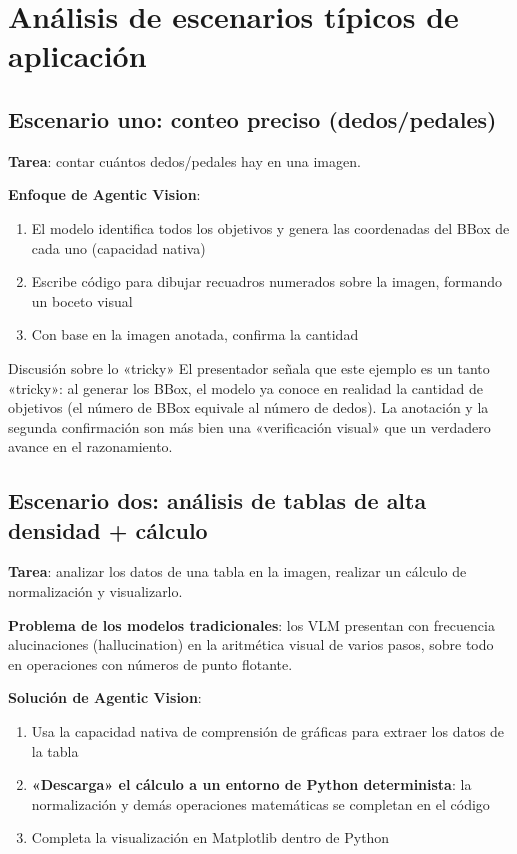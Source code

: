 \documentclass[a4paper]{article}
\begin{document}
\section{Análisis de escenarios típicos de aplicación}

\subsection{Escenario uno: conteo preciso (dedos/pedales)}

\textbf{Tarea}: contar cuántos dedos/pedales hay en una imagen.

\textbf{Enfoque de Agentic Vision}:
\begin{enumerate}
    \item El modelo identifica todos los objetivos y genera las coordenadas del BBox de cada uno (capacidad nativa)
    \item Escribe código para dibujar recuadros numerados sobre la imagen, formando un boceto visual
    \item Con base en la imagen anotada, confirma la cantidad
\end{enumerate}

\begin{warningbox}{Discusión sobre lo «tricky»}
El presentador señala que este ejemplo es un tanto «tricky»: al generar los BBox, el modelo ya conoce en realidad la cantidad de objetivos (el número de BBox equivale al número de dedos). La anotación y la segunda confirmación son más bien una «verificación visual» que un verdadero avance en el razonamiento.
\end{warningbox}

\subsection{Escenario dos: análisis de tablas de alta densidad + cálculo}

\textbf{Tarea}: analizar los datos de una tabla en la imagen, realizar un cálculo de normalización y visualizarlo.

\textbf{Problema de los modelos tradicionales}: los VLM presentan con frecuencia alucinaciones (hallucination) en la aritmética visual de varios pasos, sobre todo en operaciones con números de punto flotante.

\textbf{Solución de Agentic Vision}:
\begin{enumerate}
    \item Usa la capacidad nativa de comprensión de gráficas para extraer los datos de la tabla
    \item \textbf{«Descarga» el cálculo a un entorno de Python determinista}: la normalización y demás operaciones matemáticas se completan en el código
    \item Completa la visualización en Matplotlib dentro de Python
\end{enumerate}
\end{document}
